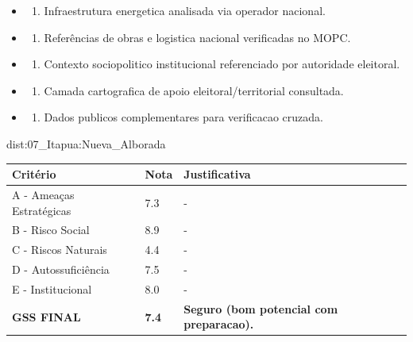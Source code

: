 {\begin{itemize}
\item
  \begin{enumerate}
  \def\labelenumi{\arabic{enumi})}
  \setcounter{enumi}{7}
  \tightlist
  \item
    Infraestrutura energetica analisada via operador nacional.
  \end{enumerate}
\item
  \begin{enumerate}
  \def\labelenumi{\arabic{enumi})}
  \setcounter{enumi}{8}
  \tightlist
  \item
    Referências de obras e logistica nacional verificadas no MOPC.
  \end{enumerate}
\item
  \begin{enumerate}
  \def\labelenumi{\arabic{enumi})}
  \setcounter{enumi}{9}
  \tightlist
  \item
    Contexto sociopolitico institucional referenciado por autoridade
    eleitoral.
  \end{enumerate}
\item
  \begin{enumerate}
  \def\labelenumi{\arabic{enumi})}
  \setcounter{enumi}{10}
  \tightlist
  \item
    Camada cartografica de apoio eleitoral/\allowbreak territorial consultada.
  \end{enumerate}
\item
  \begin{enumerate}
  \def\labelenumi{\arabic{enumi})}
  \setcounter{enumi}{11}
  \tightlist
  \item
    Dados publicos complementares para verificacao cruzada.
  \end{enumerate}
\end{itemize}}{dist:07_Itapua:Nueva_Alborada}
\begin{table}[ht!]
\small \begin{tabular}{p{3.0cm}p{0.8cm}p{6.0cm}} \toprule
\textbf{Critério} & \textbf{Nota} & \textbf{Justificativa} \\ \midrule
A - Ameaças Estratégicas & 7.3 & - \\
B - Risco Social & 8.9 & - \\
C - Riscos Naturais & 4.4 & - \\
D - Autossuficiência & 7.5 & - \\
E - Institucional & 8.0 & - \\
\midrule \textbf{GSS FINAL} & \textbf{7.4} & \textbf{Seguro (bom potencial com preparacao).} \\ \bottomrule \end{tabular}
\end{table}
